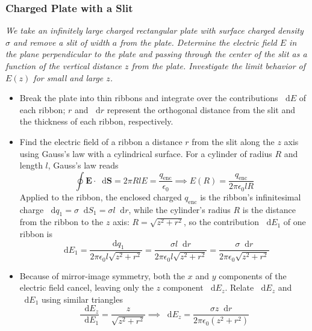 \documentclass[11pt, a4paper]{article}
\newcommand{\diff}{\mathop{}\!\mathrm{d}} %
\renewcommand{\vec}[1]{\bm{#1}} %
\newcommand{\ee}{\epsilon_{0}}  %
\begin{document}
\subsubsection{Charged Plate with a Slit}
\textit{We take an infinitely large charged rectangular plate with surface charged density $ \sigma $ and remove a slit of width $ a $ from the plate. Determine the electric field $ E $ in the plane perpendicular to the plate and passing through the center of the slit as a function of the vertical distance $ z $ from the plate. Investigate the limit behavior of $ E(z) $ for small and large $ z $.}
\begin{itemize}
	\item Break the plate into thin ribbons and integrate over the contributions $ \diff E $ of each ribbon; $ r $ and $ \diff r $ represent the orthogonal distance from the slit and the thickness of each ribbon, respectively.
	
	\item Find the electric field of a ribbon a distance $ r $ from the slit along the $ z $ axis using Gauss's law with a cylindrical surface. For a cylinder of radius $ R $ and length $ l $, Gauss's law reads
	\begin{equation*}
		\oint \vec{E} \cdot \diff \vec{S} = 2\pi R l E = \frac{q_{\text{enc}}}{\ee} \implies E(R) = \frac{q_{\text{enc}}}{2\pi \ee l R}
	\end{equation*}
	Applied to the ribbon, the enclosed charged $ q_{\text{enc}} $ is the ribbon's infinitesimal charge $ \diff q_{1} = \sigma \diff S_{1} = \sigma l \diff r $, while the cylinder's radius $ R $ is the distance from the ribbon to the $ z $ axis: $ R = \sqrt{z^{2} + r^{2}} $, so the contribution $ \diff E_{1} $ of one ribbon is
	\begin{equation*}
		\diff E_{1} = \frac{\diff q_{1}}{2\pi \ee l \sqrt{z^{2} + r^{2}}} = \frac{\sigma l \diff r}{2\pi \ee l\sqrt{z^{2} + r^{2}} } = \frac{\sigma \diff r}{2\pi \ee \sqrt{z^{2} + r^{2}} }
	\end{equation*}
	
	\item Because of mirror-image symmetry, both the $ x $ and $ y $ components of the electric field cancel, leaving only the $ z $ component $ \diff E_{z} $. Relate $ \diff E_{z} $ and $ \diff E_{1} $ using similar triangles
	\begin{equation*}
		\frac{\diff E_{z}}{\diff E_{1}} = \frac{z}{\sqrt{z^{2} + r^{2}}} \implies  \diff E_{z} = \frac{\sigma z \diff r}{2\pi \ee (z^{2} + r^{2})}
	\end{equation*}
	

\end{itemize}
\end{document}
